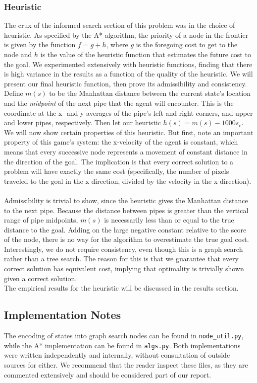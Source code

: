 \documentclass[11pt]{article}
\begin{document}
\subsubsection{Heuristic}
The crux of the informed search section of this problem was in the choice of heuristic.
As specified by the A* algorithm, the priority of a node in the frontier is given
by the function $f = g + h$, where $g$ is the foregoing cost to get to the node and
$h$ is the value of the heuristic function that estimates the future cost to the goal.
We experimented extensively with heuristic functions, finding that there is high variance
in the results as a function of the quality of the heuristic. We will present our
final heuristic function, then prove its admissibility and consistency. Define $m(s)$
to be the Manhattan distance between the current state's location and the \emph{midpoint}
of the next pipe that the agent will encounter. This is the coordinate at the x-
and y-averages of the pipe's left and right corners, and upper and lower pipes,
respectively. Then let our heuristic $h(s) = m(s) - 1000s_c$. We will now show certain
properties of this heuristic. But first, note an important property of this game's
system: the x-velocity of the agent is constant, which means that every successive
node represents a movement of constant distance in the direction of the goal.
The implication is that every correct solution to a problem will have exactly
the same cost (specifically, the number of pixels traveled to the goal in the x
direction, divided by the velocity in the x direction). \\\\
Admissibility is trivial to show, since the heuristic gives the Manhattan distance to
the next pipe. Because the distance between pipes is greater than the vertical range
of pipe midpoints, $m(s)$ is necessarily less than or equal to the true distance to the
goal. Adding on the large negative constant relative to the score of the node, there is no way
for the algorithm to overestimate the true goal cost.
Interestingly, we do not require consistency, even though this is a graph search
rather than a tree search. The reason for this is that we guarantee that every
correct solution has equivalent cost, implying that optimality is trivially shown
given a correct solution.\\
The empirical results for the heuristic will be discussed in the results section.

\subsection{Implementation Notes}
The encoding of states into graph search nodes can be found in \texttt{node\_util.py},
while the A* implementation can be found in \texttt{algs.py}. Both implementations
were written independently and internally, without consultation of outside sources
for either. We recommend that the reader inspect these files, as they are commented
extensively and should be considered part of our report.
\end{document}
